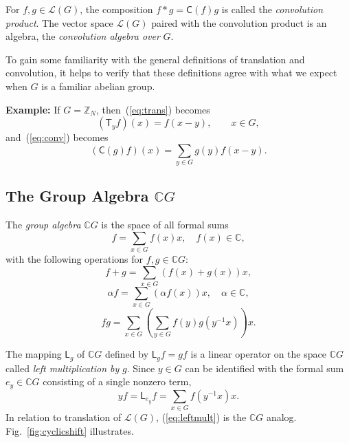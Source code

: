 \documentclass[reqno,onecolumn,oneside]{paper}
\newcommand{\<}{\ensuremath{\langle}}
\renewcommand{\>}{\ensuremath{\rangle}}
\newcommand{\field}[1]{\ensuremath{\mathbb{#1}}}
\newcommand{\Z}{\field{Z}}                   %
\newcommand{\C}{\field{C}}                   %
\newcommand{\vs}[1]{\ensuremath{\mathcal{#1}}}
\newcommand{\LG}{\vs{L}(G)}        %
\newcommand{\lt}[1]{\ensuremath{\mathsf{#1}}}
\newcommand{\ga}[1]{\ensuremath{\C #1}} %
\newcommand{\CG}{\ga{G}}                %
\begin{document}
For $f, g \in \LG$, the composition
$f * g  = \lt{C}(f)g$
is called the \emph{convolution product}.
The vector space $\LG$ paired with the convolution product
is an algebra, the \emph{convolution algebra over} $G$.

To gain some familiarity with the general 
definitions of translation %
and convolution, %
it helps to verify 
that these definitions agree with what we expect 
when $G$ is a familiar abelian group. 
\begin{example}
{\bf Example:}
If $G=\Z_N$, then~(\ref{eq:trans}) becomes
\begin{equation}
(\lt{T}_yf)(x) = f(x-y),  \qquad x \in G,
\end{equation}
and~(\ref{eq:conv}) becomes
\begin{equation}
(\lt{C}(g)f)(x) =\sum_{y \in G} g(y)f(x-y).
\end{equation}
\end{example}

% 
\subsection{The Group Algebra $\CG$}
\label{sec:groupalgebra}
The \emph{group algebra} $\CG$ is the space of all formal sums
\begin{equation}
f = \sum_{x\in G} f(x) x, \quad f(x) \in \C,
\end{equation}
with the following operations for $f, g \in \CG$:
\begin{equation}
f+g = \sum_{x\in G} (f(x) + g(x))x,
\end{equation}
\begin{equation}
\alpha f = \sum_{x\in G} (\alpha f(x)) x, 
           \quad \alpha \in \C,
\end{equation}
\begin{equation}
fg = \sum_{x\in G}\left(\sum_{y\in G} f(y)g(y^{-1}x)\right)x. 
\end{equation}

The mapping $\lt{L}_g$ of $\CG$ defined by 
$\lt{L}_gf = gf$
is a linear operator on the space $\CG$ called 
\emph{left multiplication by} $g$.  
Since $y\in G$ can be identified with the formal
sum $e_y \in \CG$ consisting of a single nonzero term,
\begin{equation}\label{eq:leftmult}
yf = \lt{L}_{e_y}f = \sum_{x\in G}f(y^{-1}x) x.
\end{equation}
In relation to translation of $\LG$, (\ref{eq:leftmult}) is the
$\CG$ analog. Fig.~\ref{fig:cyclicshift} illustrates.
\end{document}
